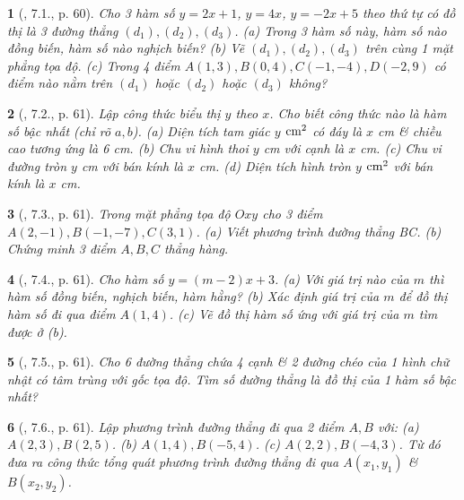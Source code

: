 \documentclass{article}
\newtheorem{baitoan}{}
\begin{document}
\begin{baitoan}[\cite{Binh_boi_duong_Toan_9_tap_1}, 7.1., p. 60]
	Cho 3 hàm số $y = 2x + 1$, $y = 4x$, $y = -2x + 5$ theo thứ tự có đồ thị là 3 đường thẳng $(d_1),(d_2),(d_3)$. (a) Trong 3 hàm số này, hàm số nào đồng biến, hàm số nào nghịch biến? (b) Vẽ $(d_1),(d_2),(d_3)$ trên cùng 1 mặt phẳng tọa độ. (c) Trong 4 điểm $A(1,3),B(0,4),C(-1,-4),D(-2,9)$ có điểm nào nằm trên $(d_1)$ hoặc $(d_2)$ hoặc $(d_3)$ không?
\end{baitoan}

\begin{baitoan}[\cite{Binh_boi_duong_Toan_9_tap_1}, 7.2., p. 61]
	Lập công thức biểu thị $y$ theo $x$. Cho biết công thức nào là hàm số bậc nhất (chỉ rõ $a,b$). (a) Diện tích tam giác $y$ $\rm cm^2$ có đáy là $x$ {\rm cm} \& chiều cao tương ứng là {\rm6 cm}. (b) Chu vi hình thoi $y$ {\rm cm} với cạnh là $x$ {\rm cm}. (c) Chu vi đường tròn $y$ {\rm cm} với bán kính là $x$ {\rm cm}. (d) Diện tích hình tròn $y$ $\rm cm^2$ với bán kính là $x$ {\rm cm}.
\end{baitoan}

\begin{baitoan}[\cite{Binh_boi_duong_Toan_9_tap_1}, 7.3., p. 61]
	Trong mặt phẳng tọa độ $Oxy$ cho 3 điểm $A(2,-1),B(-1,-7),C(3,1)$. (a) Viết phương trình đường thẳng BC. (b) Chứng minh 3 điểm $A,B,C$ thẳng hàng.
\end{baitoan}

\begin{baitoan}[\cite{Binh_boi_duong_Toan_9_tap_1}, 7.4., p. 61]
	Cho hàm số $y = (m - 2)x + 3$. (a) Với giá trị nào của $m$ thì hàm số đồng biến, nghịch biến, hàm hằng? (b) Xác định giá trị của $m$ để đồ thị hàm số đi qua điểm $A(1,4)$. (c) Vẽ đồ thị hàm số ứng với giá trị của $m$ tìm được ở (b).
\end{baitoan}

\begin{baitoan}[\cite{Binh_boi_duong_Toan_9_tap_1}, 7.5., p. 61]
	Cho 6 đường thẳng chứa 4 cạnh \& 2 đường chéo của 1 hình chữ nhật có tâm trùng với gốc tọa độ. Tìm số đường thẳng là đồ thị của 1 hàm số bậc nhất?
\end{baitoan}

\begin{baitoan}[\cite{Binh_boi_duong_Toan_9_tap_1}, 7.6., p. 61]
	Lập phương trình đường thẳng đi qua 2 điểm $A,B$ với: (a) $A(2,3),B(2,5)$. (b) $A(1,4),B(-5,4)$. (c) $A(2,2),B(-4,3)$. Từ đó đưa ra công thức tổng quát phương trình đường thẳng đi qua $A(x_1,y_1)$ \& $B(x_2,y_2)$.
\end{baitoan}
\end{document}
